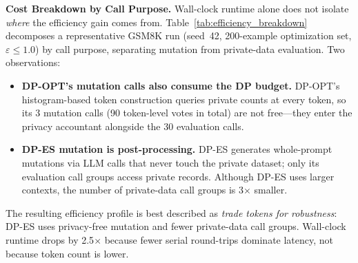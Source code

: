 \noindent\textbf{Cost Breakdown by Call Purpose.}
Wall-clock runtime alone does not isolate \textit{where} the efficiency gain comes from. Table~\ref{tab:efficiency_breakdown} decomposes a representative GSM8K run (seed~42, 200-example optimization set, $\varepsilon\leq1.0$) by call purpose, separating mutation from private-data evaluation. Two observations:
\begin{itemize}[leftmargin=*,itemsep=-0.2em,topsep=2pt]
\item \textbf{DP-OPT's mutation calls also consume the DP budget.} DP-OPT's histogram-based token construction queries private counts at every token, so its 3 mutation calls (90 token-level votes in total) are not free---they enter the privacy accountant alongside the 30 evaluation calls.
\item \textbf{DP-ES mutation is post-processing.} DP-ES generates whole-prompt mutations via LLM calls that never touch the private dataset; only its evaluation call groups access private records. Although DP-ES uses larger contexts, the number of private-data call groups is 3$\times$ smaller.
\end{itemize}
The resulting efficiency profile is best described as \textit{trade tokens for robustness}: DP-ES uses privacy-free mutation and fewer private-data call groups. Wall-clock runtime drops by 2.5$\times$ because fewer serial round-trips dominate latency, not because token count is lower.

